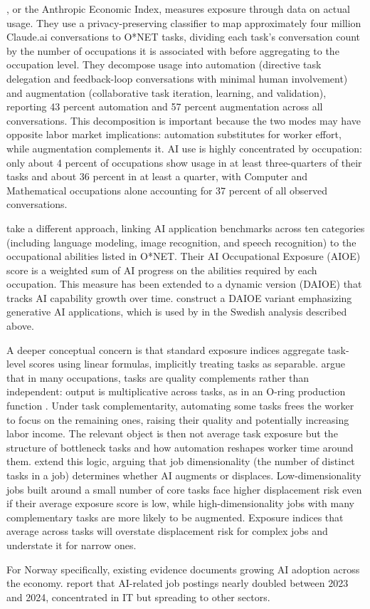 \cite{handa2025}, or the Anthropic Economic Index, measures exposure through data on actual usage. They use a privacy-preserving classifier to map approximately four million Claude.ai conversations to O*NET tasks, dividing each task's conversation count by the number of occupations it is associated with before aggregating to the occupation level. They decompose usage into automation (directive task delegation and feedback-loop conversations with minimal human involvement) and augmentation (collaborative task iteration, learning, and validation), reporting 43 percent automation and 57 percent augmentation across all conversations. This decomposition is important because the two modes may have opposite labor market implications: automation substitutes for worker effort, while augmentation complements it. AI use is highly concentrated by occupation: only about 4 percent of occupations show usage in at least three-quarters of their tasks and about 36 percent in at least a quarter, with Computer and Mathematical occupations alone accounting for 37 percent of all observed conversations.

\cite{felten2021} take a different approach, linking AI application benchmarks across ten categories (including language modeling, image recognition, and speech recognition) to the occupational abilities listed in O*NET. Their AI Occupational Exposure (AIOE) score is a weighted sum of AI progress on the abilities required by each occupation. This measure has been extended to a dynamic version (DAIOE) that tracks AI capability growth over time. \cite{engberg2024} construct a DAIOE variant emphasizing generative AI applications, which is used by \cite{lodefalk2026} in the Swedish analysis described above.

A deeper conceptual concern is that standard exposure indices aggregate task-level scores using linear formulas, implicitly treating tasks as separable. \cite{gans2025} argue that in many occupations, tasks are quality complements rather than independent: output is multiplicative across tasks, as in an O-ring production function \citep{kremer1993}. Under task complementarity, automating some tasks frees the worker to focus on the remaining ones, raising their quality and potentially increasing labor income. The relevant object is then not average task exposure but the structure of bottleneck tasks and how automation reshapes worker time around them. \cite{imas2026} extend this logic, arguing that job dimensionality (the number of distinct tasks in a job) determines whether AI augments or displaces. Low-dimensionality jobs built around a small number of core tasks face higher displacement risk even if their average exposure score is low, while high-dimensionality jobs with many complementary tasks are more likely to be augmented. Exposure indices that average across tasks will overstate displacement risk for complex jobs and understate it for narrow ones.

For Norway specifically, existing evidence documents growing AI adoption across the economy. \cite{kompetansebehovsutvalget2026} report that AI-related job postings nearly doubled between 2023 and 2024, concentrated in IT but spreading to other sectors.

